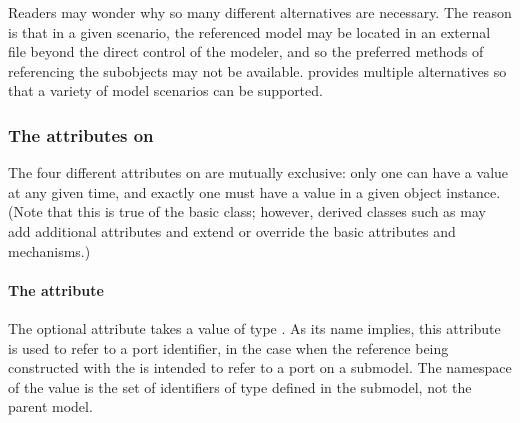 Readers may wonder why so many different alternatives are necessary.
The reason is that in a given scenario, the referenced model may be
located in an external file beyond the direct control of the modeler,
and so the preferred methods of referencing the subobjects may not be
available.  \SBaseRef provides multiple alternatives so that a variety
of model scenarios can be supported.



\subsubsection{The attributes on }

The four different attributes on \SBaseRef are mutually exclusive: only
one can have a value at any given time, and exactly one must have a
value in a given \SBaseRef object instance.  (Note that this is true of
the basic \SBaseRef class; however, derived classes such as
\ReplacedElement may add additional attributes and extend or override
the basic attributes and mechanisms.)


\paragraph{The \hspace*{1pt} attribute}

The optional attribute  takes a value of type
.  As its name implies, this attribute is used to
refer to a port identifier, in the case when the reference being
constructed with the \SBaseRef is intended to refer to a port on a
submodel.  The namespace of the  value is the set
of identifiers of type  defined in the submodel, not
the parent model.


